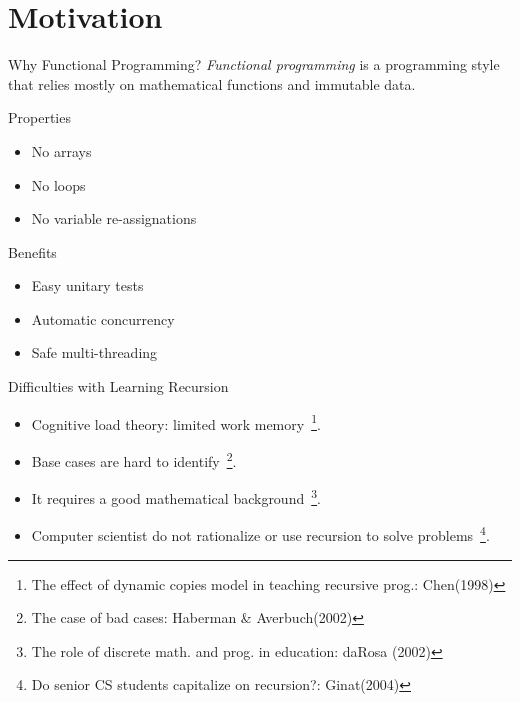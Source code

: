 \section{Motivation}

\begin{frame}{Why Functional Programming?}
  \emph{Functional programming} is a programming style that relies
  mostly on mathematical functions and immutable data.
  \begin{block}{Properties}
    \begin{itemize}
    \item No arrays
    \item No loops
    \item No variable re-assignations
    \end{itemize}
  \end{block}
  \begin{block}{Benefits}
    \begin{itemize}
    \item Easy unitary tests
    \item Automatic concurrency
    \item Safe multi-threading
    \end{itemize}
  \end{block}
\end{frame}

\begin{frame}{Difficulties with Learning Recursion}
  \begin{itemize}
  \item Cognitive load theory: limited work memory~\footnote{The effect of
    dynamic copies model in teaching recursive prog.: Chen(1998)}.
  \item Base cases are hard to identify~\footnote{The case of bad cases: Haberman
    \& Averbuch(2002)}.
  \item It requires a good mathematical background~\footnote{The role of
    discrete math. and prog. in education: daRosa (2002)}.
  \item Computer scientist do not rationalize or use recursion to solve
    problems~\footnote{Do senior CS students capitalize on recursion?: Ginat(2004)}.
  \end{itemize}
\end{frame}

